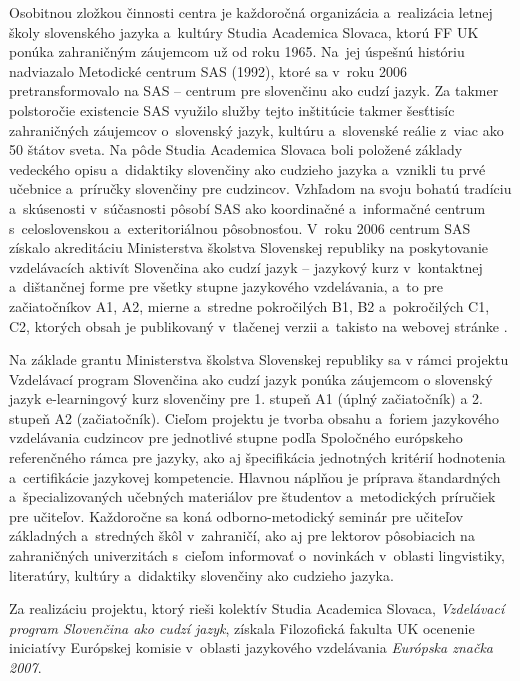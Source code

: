\begin{multicols}{2}
Osobitnou zložkou činnosti centra je každoročná organizácia a~realizácia letnej školy slovenského jazyka a~kultúry Studia Academica Slovaca, ktorú FF UK ponúka zahraničným záujemcom už od roku 1965. Na~jej úspešnú históriu nadviazalo Metodické centrum SAS (1992), ktoré sa v~roku 2006 pretransformovalo na SAS – centrum pre slovenčinu ako cudzí jazyk. Za takmer polstoročie existencie SAS využilo služby tejto inštitúcie takmer šesťtisíc zahraničných záujemcov o~slovenský jazyk, kultúru a~slovenské reálie z~viac ako 50 štátov sveta. Na pôde Studia Academica Slovaca boli položené základy vedeckého opisu a~didaktiky slovenčiny ako cudzieho jazyka a~vznikli tu prvé učebnice a~príručky slovenčiny pre cudzincov. Vzhľadom na svoju bohatú tradíciu a~skúsenosti v~súčasnosti pôsobí SAS ako koordinačné a~informačné centrum s~celoslovenskou a~exteritoriálnou pôsobnosťou.
V~roku 2006 centrum SAS získalo akreditáciu Ministerstva školstva Slovenskej republiky na poskytovanie vzdelávacích aktivít Slovenčina ako cudzí jazyk – jazykový kurz v~kontaktnej a~dištančnej forme pre všetky stupne jazykového vzdelávania, a~to pre začiatočníkov A1, A2, mierne a~stredne pokročilých B1, B2 a~pokročilých C1, C2, ktorých obsah je publikovaný v~tlačenej verzii \cite{pekarovicova2007} a~takisto na webovej stránke \cite{f9}.

Na základe grantu Ministerstva školstva Slovenskej republiky sa v rámci projektu Vzdelávací program Slovenčina ako cudzí jazyk ponúka záujemcom o slovenský jazyk e-learningový kurz slovenčiny \cite{f33} pre 1. stupeň A1 (úplný začiatočník) a 2. stupeň A2 (začiatočník). Cieľom projektu je tvorba obsahu a~foriem jazykového vzdelávania cudzincov pre jednotlivé stupne podľa Spoločného európskeho referenčného rámca pre jazyky, ako aj špecifikácia jednotných kritérií hodnotenia a~certifikácie jazykovej kompetencie. Hlavnou náplňou je príprava štandardných a~špecializovaných učebných materiálov pre študentov a~metodických príručiek pre učiteľov. Každoročne sa koná odborno-metodický seminár pre učiteľov základných a~stredných škôl v~zahraničí, ako aj pre lektorov pôsobiacich na zahraničných univerzitách s~cieľom informovať o~novinkách v~oblasti lingvistiky, literatúry, kultúry a~didaktiky slovenčiny ako cudzieho jazyka.

Za realizáciu projektu, ktorý rieši kolektív Studia Academica Slovaca, \emph{Vzdelávací program Slovenčina ako cudzí jazyk}, získala Filozofická fakulta UK ocenenie iniciatívy Európskej komisie v~oblasti jazykového vzdelávania \emph{Európska značka 2007}.


\end{multicols}
